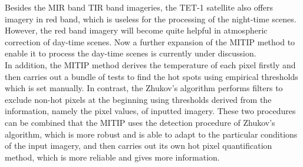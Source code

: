 \noindent Besides the MIR band TIR band imageries, the TET-1 satellite also offers imagery in red band, which is useless for the processing of the night-time scenes. However, the red band imagery will become quite helpful in atmospheric correction of day-time scenes. Now a further expansion of the MITIP method to enable it to process the day-time scenes is currently under discussion.\\

\noindent In addition, the MITIP method derives the temperature of each pixel firstly and then carries out a bundle of tests to find the hot spots using empirical thresholds which is set manually. In contrast, the Zhukov's algorithm performs filters to exclude non-hot pixels at the beginning using thresholds derived from the information, namely the pixel values, of inputted imagery. These two procedures can be combined that the MITIP uses the detection procedure of Zhukov's algorithm, which is more robust and is able to adapt to the particular conditions of the input imagery, and then carries out its own hot pixel quantification method, which is more reliable and gives more information.\\